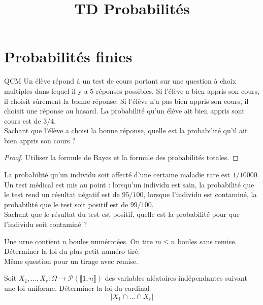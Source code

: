 \documentclass[french,a4paper]{article}
\title{TD Probabilités}
\theoremstyle{plain}
\theoremstyle{definition}
\theoremstyle{remark}
\begin{document}
\maketitle

\section{Probabilités finies}

\begin{ex}[Moulin.01]{QCM}
	Un élève répond à un test de cours portant sur une question à choix multiples dans lequel il y a 5 réponses possibles. Si l'élève a bien appris son cours, il choisit sûrement la bonne réponse. Si l'élève n'a pas bien appris son cours, il choisit une réponse au hasard. La probabilité qu'un élève ait bien appris sont cours est de $3/4$. \\ Sachant que l'élève a choisi la bonne réponse, quelle est la probabilité qu'il ait bien appris son cours ?
\end{ex}
\begin{proof}
	Utiliser la formule de Bayes et la formule des probabilités totales.
\end{proof}

\begin{ex}[Moulin.02]{}
	La probabilité qu'un individu soit affecté d'une certaine maladie rare est $1/10000$. Un test médical est mis au point : lorsqu'un individu est sain, la probabilité que le test rend un résultat négatif est de $95/100$, lorsque l'individu est contaminé, la probabilité que le test soit positif est de $99/100$. \\ Sachant que le résultat du test est positif, quelle est la probabilité pour que l'individu soit contaminé ?
\end{ex}

\begin{ex}[Moulin.03]{}
	Une urne contient $n$ boules numérotées. On tire $m\leqslant n$ boules sans remise.\\ Déterminer la loi du plus petit numéro tiré. \\ Même question pour un tirage avec remise.
\end{ex}

\begin{ex}[Moulin.04]{}
	Soit $X_1,\ldots,X_r:\Omega\to\mathcal{P}(\llbracket1,n\rrbracket)$ des variables aléatoires indépendantes suivant une loi uniforme. Déterminer la loi du cardinal $$\lvert X_1\cap\ldots\cap X_r\rvert$$
\end{ex}
\end{document}
